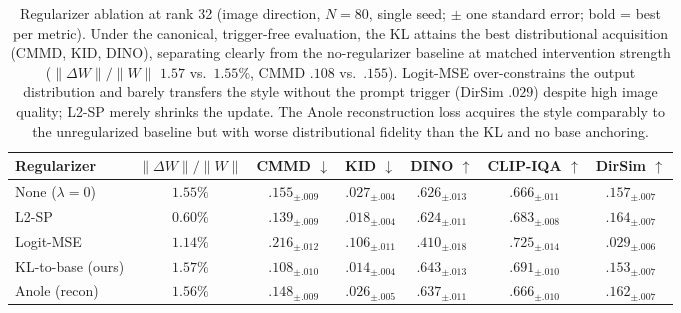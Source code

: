 \documentclass{article}
\begin{document}
\begin{table}[t]\centering\small
\setlength{\tabcolsep}{3.5pt}
\begin{tabular}{lcccccc}
\toprule
Regularizer & $\lVert\Delta W\rVert/\lVert W\rVert$ & CMMD $\downarrow$ & KID $\downarrow$ & DINO $\uparrow$ & CLIP-IQA $\uparrow$ & DirSim $\uparrow$ \\
\midrule
None ($\lambda{=}0$) & $1.55\%$ & $.155_{\pm.009}$ & $.027_{\pm.004}$ & $.626_{\pm.013}$ & $.666_{\pm.011}$ & $.157_{\pm.007}$ \\
L2-SP                & $0.60\%$ & $.139_{\pm.009}$ & $.018_{\pm.004}$ & $.624_{\pm.011}$ & $.683_{\pm.008}$ & $\mathbf{.164}_{\pm.007}$ \\
Logit-MSE            & $1.14\%$ & $.216_{\pm.012}$ & $.106_{\pm.011}$ & $.410_{\pm.018}$ & $\mathbf{.725}_{\pm.014}$ & $.029_{\pm.006}$ \\
KL-to-base (ours)    & $1.57\%$ & $\mathbf{.108}_{\pm.010}$ & $\mathbf{.014}_{\pm.004}$ & $\mathbf{.643}_{\pm.013}$ & $.691_{\pm.010}$ & $.153_{\pm.007}$ \\
Anole (recon)       & $1.56\%$ & $.148_{\pm.009}$ & $.026_{\pm.005}$ & $.637_{\pm.011}$ & $.666_{\pm.010}$ & $.162_{\pm.007}$ \\
\bottomrule
\end{tabular}
\caption{Regularizer ablation at rank 32 (image direction, $N{=}80$, single seed;
$\pm$ one standard error; bold = best per metric). Under the canonical,
trigger-free evaluation, the KL attains the best distributional acquisition
(CMMD, KID, DINO), separating clearly from the no-regularizer baseline at matched
intervention strength ($\lVert\Delta W\rVert/\lVert W\rVert$ $1.57$ vs.\ $1.55\%$,
CMMD $.108$ vs.\ $.155$). Logit-MSE over-constrains the output distribution and
barely transfers the style without the prompt trigger (DirSim $.029$) despite high
image quality; L2-SP merely shrinks the update. The Anole reconstruction loss
acquires the style comparably to the unregularized baseline but with worse
distributional fidelity than the KL and no base anchoring.}
\label{tab:reg-ablation}
\end{table}

\clearpage
\end{document}
